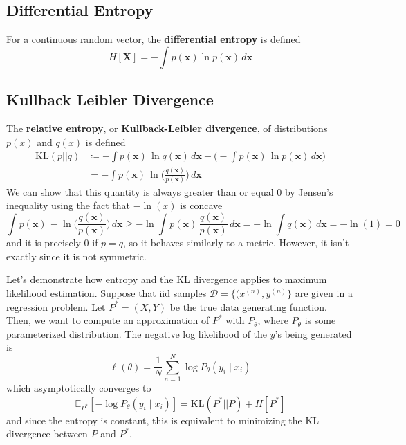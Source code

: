 \documentclass{article}
\begin{document}
  \subsection{Differential Entropy}

    \begin{definition}
      For a continuous random vector, the \textbf{differential entropy} is defined 
      \begin{equation}
        H[\mathbf{X}] = - \int p(\mathbf{x}) \ln{p(\mathbf{x})} \,d\mathbf{x}
      \end{equation}
    \end{definition}

  \subsection{Kullback Leibler Divergence}

    The \textbf{relative entropy}, or \textbf{Kullback-Leibler divergence}, of distributions $p(x)$ and $q(x)$ is defined 
    \begin{align*}
      \mathrm{KL}(p || q) & \coloneqq - \int p(\mathbf{x}) \, \ln{q(\mathbf{x})} \,d\mathbf{x} - \bigg( - \int p(\mathbf{x}) \, \ln{p(\mathbf{x})} \,d\mathbf{x} \bigg) \\
      & = - \int p(\mathbf{x}) \, \ln \bigg( \frac{q(\mathbf{x})}{p(\mathbf{x})} \bigg) \,d\mathbf{x} 
    \end{align*}
    We can show that this quantity is always greater than or equal $0$ by Jensen's inequality using the fact that $-\ln(x)$ is concave
    \begin{equation}
      \int p(\mathbf{x}) \, -\ln \bigg( \frac{q(\mathbf{x})}{p(\mathbf{x})} \bigg) \,d\mathbf{x} \geq -\ln \int p(\mathbf{x}) \, \frac{q(\mathbf{x})}{p(\mathbf{x})} \,d\mathbf{x} = -\ln \int q(\mathbf{x}) \,d\mathbf{x} = -\ln(1) = 0
    \end{equation}
    and it is precisely $0$ if $p = q$, so it behaves similarly to a metric. However, it isn't exactly since it is not symmetric. 

    Let's demonstrate how entropy and the KL divergence applies to maximum likelihood estimation. Suppose that iid samples $\mathcal{D} = \{(x^{(n)}, y^{(n)}\}$ are given in a regression problem. Let $P^\ast = (X, Y)$ be the true data generating function. Then, we want to compute an approximation of $P^\ast$ with $P_\theta$, where $P_\theta$ is some parameterized distribution. The negative log likelihood of the $y$'s being generated is 
    \begin{equation}
      \ell(\theta) = \frac{1}{N} \sum_{n=1}^N \log P_\theta (y_i \mid x_i)
    \end{equation}
    which asymptotically converges to 
    \begin{equation}
      \mathbb{E}_{P^\ast} [ -\log P_\theta (y_i \mid x_i)] = \mathrm{KL}(P^\ast || P) + H[P^\ast]
    \end{equation}
    and since the entropy is constant, this is equivalent to minimizing the KL divergence between $P$ and $P^\ast$. 
\end{document}

